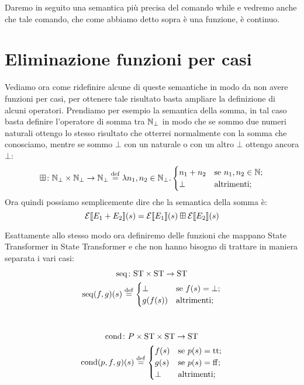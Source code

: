 Daremo in seguito una semantica più precisa del comando while e vedremo anche che tale comando, che come abbiamo detto sopra è una funzione, è continuo.

\section{Eliminazione funzioni per casi} 
Vediamo ora come ridefinire alcune di queste semantiche in modo da non avere funzioni per casi, per ottenere tale risultato basta ampliare la definizione di alcuni operatori. Prendiamo per esempio la semantica della somma, in tal caso basta definire l'operatore di somma tra $\mathbb{N}_\bot$ in modo che se sommo due numeri naturali ottengo lo stesso risultato che otterrei normalmente con la somma che conosciamo, mentre se sommo $\bot$ con un naturale o con un altro $\bot$ ottengo ancora $\bot$:
$$\fund{\conadd}{\Nset_\bot \times \Nset_\bot}{\Nset_\bot} \defeq \lambda n_1, n_2 \in \Nset_\bot . \begin{cases}
        n_1 + n_2 & \text{se } n_1, n_2 \in \Nset;\\
        \bot & \text{altrimenti;}
        \end{cases}$$
Ora quindi possiamo semplicemente dire che la semantica della somma è:
$$\mathcal{E} \llbracket E_1 + E_2 \rrbracket (s) = \mathcal{E} \llbracket E_1 \rrbracket (s) \mathbin{\boxplus} \mathcal{E} \llbracket E_2 \rrbracket (s)$$

Esattamente allo stesso modo ora definiremo delle funzioni che mappano State Transformer in State Transformer e che non hanno bisogno di trattare in maniera separata i vari casi:
\begin{gather*}
\fund{\mathrm{seq}}{\ST \times \ST}{\ST} \\
\mathrm{seq}(f,g)(s) \defeq \begin{cases}
        \bot & \text{se } f(s) = \bot;\\
        g(f(s)) & \text{altrimenti};
        \end{cases}\\
\pts
\fund{\mathrm{cond}}{P \times \ST \times \ST}{\ST} \\
\mathrm{cond}(p,f,g)(s) \defeq \begin{cases}
        f(s) & \text{se } p(s) = \ttv;\\
        g(s) & \text{se } p(s) = \ffv;\\
        \bot & \text{altrimenti};
        \end{cases}\\
\end{gather*}

